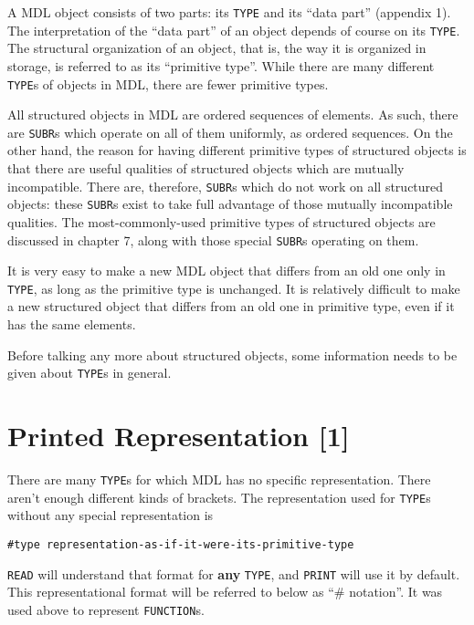 \documentclass[a4paper]{scrbook}
\begin{document}
A MDL object consists of two parts: its \texttt{TYPE} and its ``data part'' (appendix 1). The interpretation of the ``data
part'' of an object depends of course on its \texttt{TYPE}. The structural organization of an object, that is, the way it
is organized in storage, is referred to as its ``primitive type''. While there are many different \texttt{TYPE}s of objects
in MDL, there are fewer primitive types.

All structured objects in MDL are ordered sequences of elements. As such, there are \texttt{SUBR}s which operate on all of
them uniformly, as ordered sequences. On the other hand, the reason for having different primitive types of structured
objects is that there are useful qualities of structured objects which are mutually incompatible. There are, therefore,
\texttt{SUBR}s which do not work on all structured objects: these \texttt{SUBR}s exist to take full advantage of those
mutually incompatible qualities. The most-commonly-used primitive types of structured objects are discussed in chapter 7,
along with those special \texttt{SUBR}s operating on them.

It is very easy to make a new MDL object that differs from an old one only in \texttt{TYPE}, as long as the primitive type
is unchanged. It is relatively difficult to make a new structured object that differs from an old one in primitive type,
even if it has the same elements.

Before talking any more about structured objects, some information needs to be given about \texttt{TYPE}s in general.

\section{Printed Representation {[}1{]}}\label{printed-representation-1}

There are many \texttt{TYPE}s for which MDL has no specific representation. There aren't enough different kinds of
brackets. The representation used for \texttt{TYPE}s without any special representation is

\begin{verbatim}
#type representation-as-if-it-were-its-primitive-type
\end{verbatim}

 \texttt{READ} will understand that format for \textbf{any} \texttt{TYPE}, and \texttt{PRINT}
will use it by default. This representational format will be referred to below as ``\# notation''. It was used above to
represent \texttt{FUNCTION}s.
\end{document}

